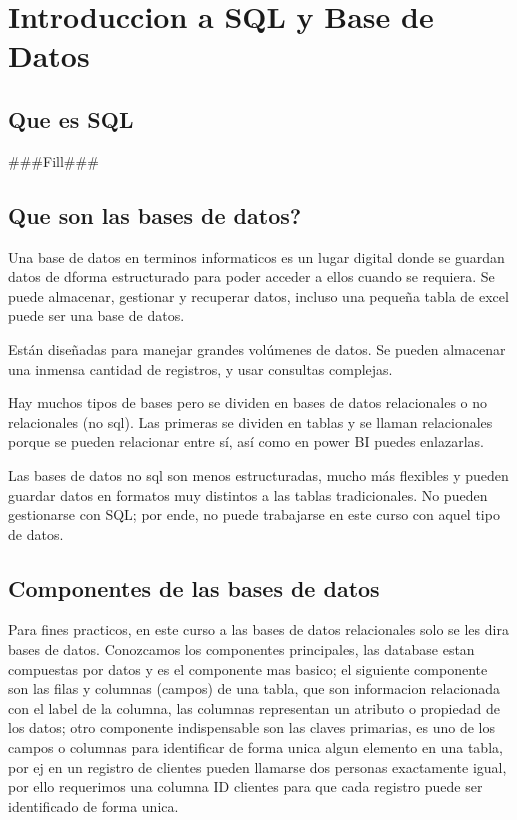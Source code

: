 \documentclass{article}
\theoremstyle{nonumberplain}
\begin{document}
\section{Introduccion a SQL y Base de Datos}
\subsection*{Que es SQL}
###Fill###

\subsection*{Que son las bases de datos?}

Una base de datos en terminos informaticos es un lugar digital donde se guardan datos de dforma estructurado para poder acceder a ellos cuando se requiera. Se puede almacenar, gestionar y recuperar datos, incluso una pequeña tabla de excel puede ser una base de datos.

Están diseñadas para manejar grandes volúmenes de datos. Se pueden almacenar una inmensa cantidad de registros, y usar consultas complejas.

Hay muchos tipos de bases pero se dividen en bases de datos relacionales o no relacionales (no sql). Las primeras se dividen en tablas y se llaman relacionales porque se pueden relacionar entre sí, así como en power BI puedes enlazarlas.

Las bases de datos no sql son menos estructuradas, mucho más flexibles y pueden guardar datos en formatos muy distintos a las tablas tradicionales. No pueden gestionarse con SQL; por ende, no puede trabajarse en este curso con aquel tipo de datos.

\subsection*{Componentes de las bases de datos}

Para fines practicos, en este curso a las bases de datos relacionales solo se les dira bases de datos. Conozcamos los componentes principales, las database estan compuestas por datos y es el componente mas basico; el siguiente componente son las filas y columnas (campos) de una tabla, que son informacion relacionada con el label de la columna, las columnas representan un atributo o propiedad de los datos; otro componente indispensable son las claves primarias, es uno de los campos o columnas para identificar de forma unica algun elemento en una tabla, por ej en un registro de clientes pueden llamarse dos personas exactamente igual, por ello requerimos una columna ID clientes para que cada registro puede ser identificado de forma unica.
\end{document}
